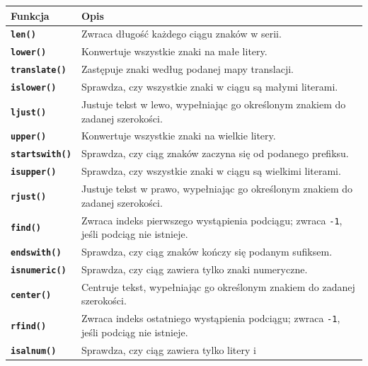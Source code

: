 \documentclass[
  polish,
  letterpaper,
  DIV=11,
  numbers=noendperiod]{scrreprt}
\newcounter{none} %
\begin{document}
{\def\LTcaptype{none} %
\begin{longtable}[]{@{}
  >{\raggedright\arraybackslash}p{}
  >{\raggedright\arraybackslash}p{}@{}}
\toprule\noalign{}
\begin{minipage}[b]{\linewidth}\raggedright
Funkcja
\end{minipage} & \begin{minipage}[b]{\linewidth}\raggedright
Opis
\end{minipage} \\
\midrule\noalign{}
\endhead
\bottomrule\noalign{}
\endlastfoot
\textbf{\texttt{len()}} & Zwraca długość każdego ciągu znaków w
serii. \\
\textbf{\texttt{lower()}} & Konwertuje wszystkie znaki na małe
litery. \\
\textbf{\texttt{translate()}} & Zastępuje znaki według podanej mapy
translacji. \\
\textbf{\texttt{islower()}} & Sprawdza, czy wszystkie znaki w ciągu są
małymi literami. \\
\textbf{\texttt{ljust()}} & Justuje tekst w lewo, wypełniając go
określonym znakiem do zadanej szerokości. \\
\textbf{\texttt{upper()}} & Konwertuje wszystkie znaki na wielkie
litery. \\
\textbf{\texttt{startswith()}} & Sprawdza, czy ciąg znaków zaczyna się
od podanego prefiksu. \\
\textbf{\texttt{isupper()}} & Sprawdza, czy wszystkie znaki w ciągu są
wielkimi literami. \\
\textbf{\texttt{rjust()}} & Justuje tekst w prawo, wypełniając go
określonym znakiem do zadanej szerokości. \\
\textbf{\texttt{find()}} & Zwraca indeks pierwszego wystąpienia
podciągu; zwraca \texttt{-1}, jeśli podciąg nie istnieje. \\
\textbf{\texttt{endswith()}} & Sprawdza, czy ciąg znaków kończy się
podanym sufiksem. \\
\textbf{\texttt{isnumeric()}} & Sprawdza, czy ciąg zawiera tylko znaki
numeryczne. \\
\textbf{\texttt{center()}} & Centruje tekst, wypełniając go określonym
znakiem do zadanej szerokości. \\
\textbf{\texttt{rfind()}} & Zwraca indeks ostatniego wystąpienia
podciągu; zwraca \texttt{-1}, jeśli podciąg nie istnieje. \\
\textbf{\texttt{isalnum()}} & Sprawdza, czy ciąg zawiera tylko litery i

\end{longtable}}
\end{document}
